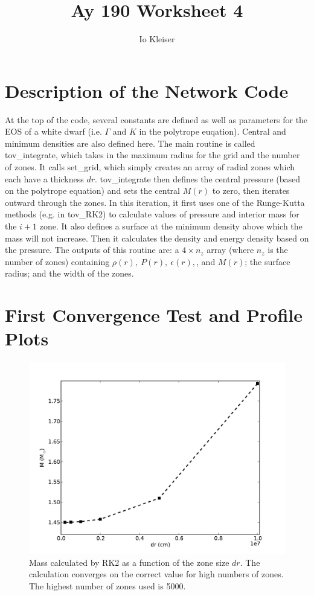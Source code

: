 \documentclass[12pt,preprint]{aastex}
\begin{document}

\title {Ay 190 Worksheet 4} 

\author{Io Kleiser}  

\section{Description of the Network Code}

At the top of the code, several constants are defined as well as parameters for the EOS of a white dwarf (i.e. $\Gamma$ and $K$ in the polytrope euqation). Central and minimum densities are also defined here. The main routine is called tov\_integrate, which takes in the maximum radius for the grid and the number of zones. It calls set\_grid, which simply creates an array of radial zones which each have a thickness $dr$. tov\_integrate then defines the central pressure (based on the polytrope equation) and sets the central $M(r)$ to zero, then iterates outward through the zones. In this iteration, it first uses one of the Runge-Kutta methods (e.g. in tov\_RK2) to calculate values of pressure and interior mass for the $i+1$ zone. It also defines a surface at the minimum density above which the mass will not increase. Then it calculates the density and energy density based on the pressure. The outputs of this routine are: a $4\times n_z$ array (where $n_z$ is the number of zones) containing $\rho(r),~P(r),~\epsilon(r),$, and $M(r)$; the surface radius; and the width of the zones.

\section{First Convergence Test and Profile Plots}


\begin{figure}[!ht]
\begin{center}
\includegraphics[width=5in]{RK2_mass.pdf}
\end{center}
\caption{Mass calculated by RK2 as a function of the zone size $dr$. The calculation converges on the correct value for high numbers of zones. The highest number of zones used is 5000. \label{f:RK2_mass}}
\end{figure}
\end{document}
